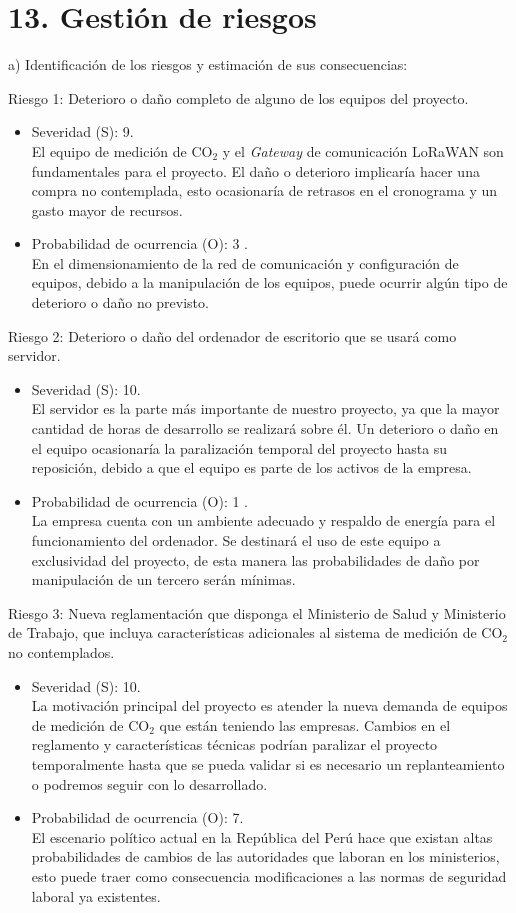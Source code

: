 \documentclass[
11pt, %
]{charter}
\begin{document}
\section{13. Gestión de riesgos}
\label{sec:riesgos}
a) Identificación de los riesgos y estimación de sus consecuencias:

Riesgo 1: Deterioro o daño completo de alguno de los equipos del proyecto.
\begin{itemize}
	\item Severidad (S): 9.\\
	 El equipo de medición de CO$_{2}$ y el \textit{Gateway} de comunicación LoRaWAN son fundamentales para el proyecto. El daño o deterioro implicaría hacer una compra no contemplada, esto ocasionaría de retrasos en el cronograma y un gasto mayor de recursos.
	\item Probabilidad de ocurrencia (O): 3 .\\
	En el dimensionamiento de la red de comunicación y configuración de equipos, debido a la manipulación de los equipos, puede ocurrir algún tipo de deterioro o daño no previsto. 
\end{itemize}  

Riesgo 2: Deterioro o daño del ordenador de escritorio que se usará como servidor.
\begin{itemize}
	\item Severidad (S): 10.\\
	 El servidor es la parte más importante de nuestro proyecto, ya que la mayor cantidad de horas de desarrollo se realizará sobre él. Un deterioro o daño en el equipo ocasionaría la paralización temporal del proyecto hasta su reposición, debido a que el equipo es parte de los activos de la empresa. 
	\item Probabilidad de ocurrencia (O): 1 .\\
	La empresa cuenta con un ambiente adecuado y respaldo de energía para el funcionamiento del ordenador. Se destinará el uso de este equipo a exclusividad del proyecto, de esta manera las probabilidades de daño por manipulación de un tercero serán mínimas.
\end{itemize} 

Riesgo 3: Nueva reglamentación que disponga el Ministerio de Salud y Ministerio de Trabajo, que incluya características adicionales al sistema de medición de CO$_{2}$ no contemplados.
\begin{itemize}
	\item Severidad (S): 10.\\
	 La motivación principal del proyecto es atender la nueva demanda de equipos de medición de CO$_{2}$  que están teniendo las empresas. Cambios en el reglamento y características técnicas podrían paralizar el proyecto temporalmente hasta que se pueda validar si es necesario un replanteamiento o podremos seguir con lo desarrollado.
	\item Probabilidad de ocurrencia (O): 7.\\
	El escenario político actual en la República del Perú hace que existan altas probabilidades de cambios de las autoridades que laboran en los ministerios, esto puede traer como consecuencia modificaciones a las normas de seguridad laboral ya existentes.
\end{itemize} 
\end{document}

